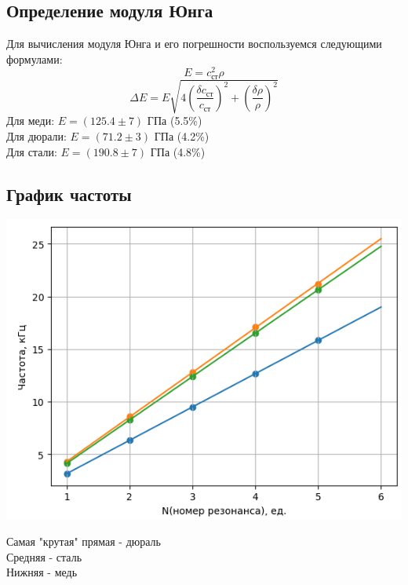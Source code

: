 \documentclass[a4, 12pt]{article}
\begin{document}
	\subsection{Определение модуля Юнга}
 Для вычисления модуля Юнга и его погрешности воспользуемся следующими формулами:
 \begin{equation}
		E = c_\text{ст}^2 \rho
		\label{Ung}
	\end{equation}
	\begin{equation}
		\Delta E = E \sqrt{4(\frac{\delta c_\text{ст}}{c_\text{ст}})^2 + (\frac{\delta\rho}{\rho})^2}
		\label{Ung acc}
	\end{equation}
	Для меди: $E = (125.4 \pm 7)\text{ ГПа}$ (5.5\%) \\
	Для дюрали: $E = (71.2 \pm 3)\text{ ГПа}$ (4.2\%) \\
	Для стали: $E = (190.8 \pm 7)\text{ ГПа}$ (4.8\%)
	\subsection{График частоты}
 \begin{center}
		\includegraphics[width=1\textwidth]{graphik.png}
	\end{center}
 Самая "крутая" прямая - дюраль\\
 Средняя - сталь\\
 Нижняя - медь\\
\end{document}
